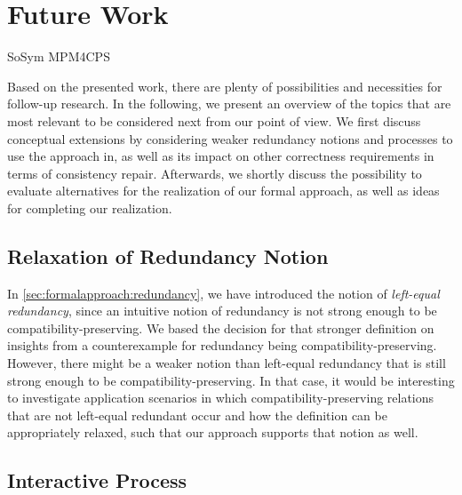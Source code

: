 \section{Future Work
}
\label{chap:futurework}

\begin{copiedFrom}{SoSym MPM4CPS}

Based on the presented work, there are plenty of possibilities and necessities for follow-up research.
In the following, we present an overview of the topics that are most relevant to be considered next from our point of view.
We first discuss conceptual extensions by considering weaker redundancy notions and processes to use the approach in, as well as its impact on other correctness requirements in terms of consistency repair.
Afterwards, we shortly discuss the possibility to evaluate alternatives for the realization of our formal approach, as well as ideas for completing our realization.

\subsection{Relaxation of Redundancy Notion}
In \autoref{sec:formalapproach:redundancy}, we have introduced the notion of \emph{left-equal redundancy}, since an intuitive notion of redundancy is not strong enough to be compatibility-preserving.
We based the decision for that stronger definition on insights from a counterexample for redundancy being compatibility-preserving.
However, there might be a weaker notion than left-equal redundancy that is still strong enough to be compatibility-preserving.
In that case, it would be interesting to investigate application scenarios in which compatibility-preserving relations that are not left-equal redundant occur and how the definition can be appropriately relaxed, such that our approach supports that notion as well.

\subsection{Interactive Process}
\label{sec:futurework:compatibilityprocess}


\end{copiedFrom}
